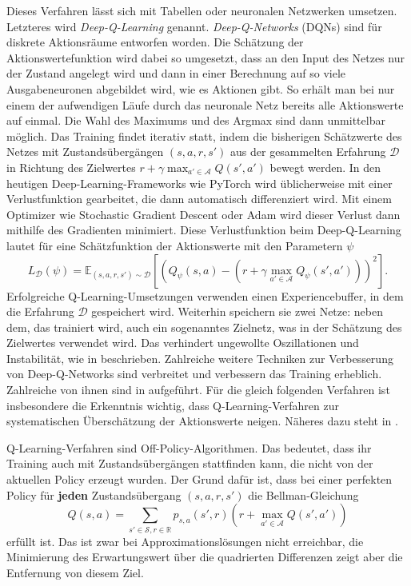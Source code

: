 Dieses Verfahren lässt sich mit Tabellen oder neuronalen Netzwerken umsetzen.
Letzteres wird \textit{Deep-Q-Learning} genannt.
\textit{Deep-Q-Networks} (DQNs) sind für diskrete Aktionsräume entworfen worden.
Die Schätzung der Aktionswertefunktion wird dabei so umgesetzt, dass an den Input des Netzes nur der Zustand angelegt wird und dann in einer Berechnung auf so viele Ausgabeneuronen abgebildet wird, wie es Aktionen gibt.
So erhält man bei nur einem der aufwendigen Läufe durch das neuronale Netz bereits alle Aktionswerte auf einmal.
Die Wahl des Maximums und des Argmax sind dann unmittelbar möglich.
Das Training findet iterativ statt, indem die bisherigen Schätzwerte des Netzes mit Zustandsübergängen $(s, a, r, s')$ aus der gesammelten Erfahrung $\mathcal{D}$ in Richtung des Zielwertes $r+\gamma \max_{a'\in\mathcal{A}}{Q(s',a')}$ bewegt werden.
In den heutigen Deep-Learning-Frameworks wie PyTorch \cite{NEURIPS2019_9015} wird üblicherweise mit einer Verlustfunktion gearbeitet, die dann automatisch differenziert wird.
Mit einem Optimizer wie Stochastic Gradient Descent oder Adam \cite{adam2014} wird dieser Verlust dann mithilfe des Gradienten minimiert.
Diese Verlustfunktion beim Deep-Q-Learning lautet für eine Schätzfunktion der Aktionswerte mit den Parametern $\psi$
\begin{equation}
	L_\mathcal{D}(\psi) = \mathbb{E}_{(s, a, r, s')\sim\mathcal{D}}\left[\left(Q_\psi(s,a)-\left(r+\gamma \max_{a'\in\mathcal{A}}{Q_\psi(s',a')}\right)\right)^2\right].
\end{equation}
Erfolgreiche Q-Learning-Umsetzungen verwenden einen Experiencebuffer, in dem die Erfahrung $\mathcal{D}$ gespeichert wird.
Weiterhin speichern sie zwei Netze: neben dem, das trainiert wird, auch ein sogenanntes Zielnetz, was in der Schätzung des Zielwertes verwendet wird.
Das verhindert ungewollte Oszillationen und Instabilität, wie in \cite{atari2014} beschrieben.
Zahlreiche weitere Techniken zur Verbesserung von Deep-Q-Networks sind verbreitet und verbessern das Training erheblich.
Zahlreiche von ihnen sind in \cite{qlearningcomparison2017} aufgeführt.
Für die gleich folgenden Verfahren ist insbesondere die Erkenntnis wichtig, dass Q-Learning-Verfahren zur systematischen Überschätzung der Aktionswerte neigen.
Näheres dazu steht in \cite{qlearningoverestimation}.

Q-Learning-Verfahren sind Off-Policy-Algorithmen.
Das bedeutet, dass ihr Training auch mit Zustandsübergängen stattfinden kann, die nicht von der aktuellen Policy erzeugt wurden.
Der Grund dafür ist, dass bei einer perfekten Policy für \textbf{jeden} Zustandsübergang $(s, a, r, s')$ die Bellman-Gleichung
\begin{equation}
	Q(s, a) = \sum_{s'\in\mathcal{S}, r \in \mathbb{R}}{p_{s, a}\left(s', r\right) \left(r + \max_{a' \in \mathcal{A}}{Q(s', a')}\right)}
\end{equation}
erfüllt ist.
Das ist zwar bei Approximationslösungen nicht erreichbar, die Minimierung des Erwartungswert über die quadrierten Differenzen zeigt aber die Entfernung von diesem Ziel.

